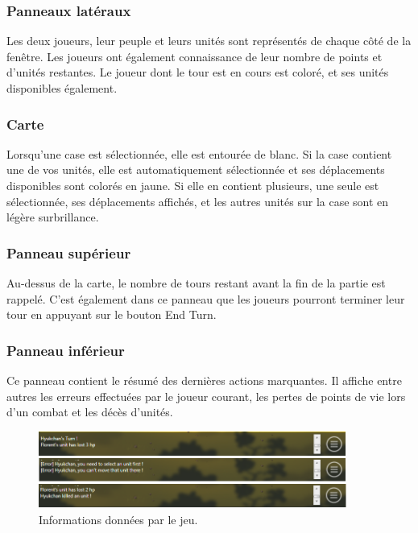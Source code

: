 \documentclass[a4paper]{article}
\begin{document}
		\subsubsection{Panneaux latéraux}
		Les deux joueurs, leur peuple et leurs unités sont représentés de chaque côté de la fenêtre. Les joueurs ont également connaissance de leur nombre de points et d'unités restantes.
		Le joueur dont le tour est en cours est coloré, et ses unités disponibles également.

		\subsubsection{Carte}
		Lorsqu'une case est sélectionnée, elle est entourée de blanc. Si la case contient une de vos unités, elle est automatiquement sélectionnée et ses déplacements disponibles sont colorés en jaune. Si elle en contient plusieurs, une seule est sélectionnée, ses déplacements affichés, et les autres unités sur la case sont en légère surbrillance.

		\subsubsection{Panneau supérieur}
		Au-dessus de la carte, le nombre de tours restant avant la fin de la partie est rappelé. C'est également dans ce panneau que les joueurs pourront terminer leur tour en appuyant sur le bouton \og End Turn\fg{}.

		\subsubsection{Panneau inférieur}
		Ce panneau contient le résumé des dernières actions marquantes. Il affiche entre autres les erreurs effectuées par le joueur courant, les pertes de points de vie lors d'un combat et les décès d'unités.
		\begin{figure}[h!]
			\centering
			\includegraphics[width=0.9\textwidth]{../../IHM/info.png}
			\caption{Informations données par le jeu.}
			\label{fig:infos}
		\end{figure}
\end{document}
